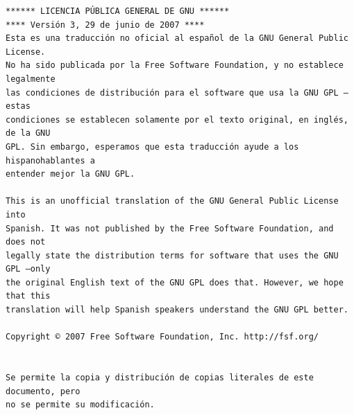 \small\begin{verbatim}
****** LICENCIA PÚBLICA GENERAL DE GNU ******
**** Versión 3, 29 de junio de 2007 ****
Esta es una traducción no oficial al español de la GNU General Public License.
No ha sido publicada por la Free Software Foundation, y no establece legalmente
las condiciones de distribución para el software que usa la GNU GPL –estas
condiciones se establecen solamente por el texto original, en inglés, de la GNU
GPL. Sin embargo, esperamos que esta traducción ayude a los hispanohablantes a
entender mejor la GNU GPL.

This is an unofficial translation of the GNU General Public License into
Spanish. It was not published by the Free Software Foundation, and does not
legally state the distribution terms for software that uses the GNU GPL –only
the original English text of the GNU GPL does that. However, we hope that this
translation will help Spanish speakers understand the GNU GPL better.

Copyright © 2007 Free Software Foundation, Inc. http://fsf.org/


Se permite la copia y distribución de copias literales de este documento, pero
no se permite su modificación.


\end{verbatim}
